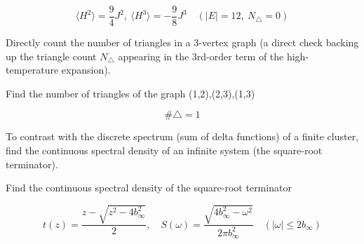 \documentclass[dvipdfmx]{article}
\begin{document}
\begin{equation}
  \langle H^2 \rangle = \frac{9}{4} J^{2},\ \langle H^3 \rangle = -\frac{9}{8} J^{3} \quad (|E| = 12,\ N_\triangle = 0)
  \label{eq:E9}
\end{equation}

Directly count the number of triangles in a 3-vertex graph (a direct check backing up the triangle count $N_\triangle$ appearing in the 3rd-order term of the high-temperature expansion).

Find the number of triangles of the graph (1,2),(2,3),(1,3)

\begin{equation}
  \#\triangle = 1
  \label{eq:E10}
\end{equation}

To contrast with the discrete spectrum (sum of delta functions) of a finite cluster, find the continuous spectral density of an infinite system (the square-root terminator).

Find the continuous spectral density of the square-root terminator

\begin{equation}
  t(z) = \frac{z - \sqrt{z^2 - 4 b_\infty^2}}{2},\quad S(\omega) = \frac{\sqrt{4 b_\infty^2 - \omega^2}}{2\pi b_\infty^2}\quad (|\omega| \le 2 b_\infty)
  \label{eq:E11}
\end{equation}
\end{document}
